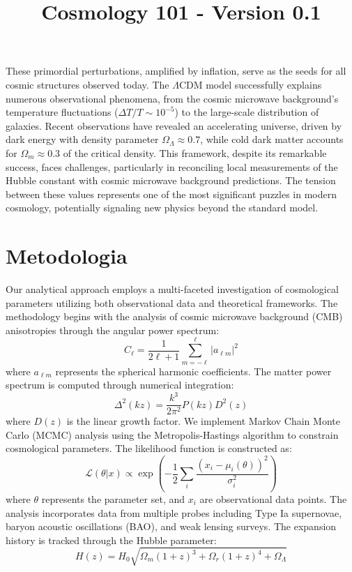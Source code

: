 \documentclass{article}\usepackage{graphicx} \usepackage{amsmath} \usepackage{colortbl}\title{Cosmology 101 - Version 0.1}
\begin{document}
These primordial perturbations, amplified by inflation, serve as the seeds for all cosmic structures observed today. The $\Lambda$CDM model successfully explains numerous observational phenomena, from the cosmic microwave background's temperature fluctuations ($\Delta T/T \sim 10^{-5}$) to the large-scale distribution of galaxies. Recent observations have revealed an accelerating universe, driven by dark energy with density parameter $\Omega_\Lambda \approx 0.7$, while cold dark matter accounts for $\Omega_m \approx 0.3$ of the critical density. This framework, despite its remarkable success, faces challenges, particularly in reconciling local measurements of the Hubble constant with cosmic microwave background predictions. The tension between these values represents one of the most significant puzzles in modern cosmology, potentially signaling new physics beyond the standard model.\section{Metodologia}
Our analytical approach employs a multi-faceted investigation of cosmological parameters utilizing both observational data and theoretical frameworks. The methodology begins with the analysis of cosmic microwave background (CMB) anisotropies through the angular power spectrum:  
\begin{equation} C_\ell = \frac{1}{2\ell + 1}\sum_{m=-\ell}^{\ell} |a_{\ell m}|^2 
\end{equation}  
where $a_{\ell m}$ represents the spherical harmonic coefficients. The matter power spectrum is computed through numerical integration:  \begin{equation} \Delta^2(k z) = \frac{k^3}{2\pi^2}P(k z)D^2(z) 
\end{equation}  
where $D(z)$ is the linear growth factor. We implement Markov Chain Monte Carlo (MCMC) analysis using the Metropolis-Hastings algorithm to constrain cosmological parameters. The likelihood function is constructed as:  
\begin{equation} 
\mathcal{L}(\theta|x) \propto \exp\left(-\frac{1}{2}\sum_i \frac{(x_i - \mu_i(\theta))^2}{\sigma_i^2}\right) 
\end{equation}  
where $\theta$ represents the parameter set, and $x_i$ are observational data points. The analysis incorporates data from multiple probes including Type Ia supernovae, baryon acoustic oscillations (BAO), and weak lensing surveys. The expansion history is tracked through the Hubble parameter:  
\begin{equation} H(z) = H_0\sqrt{\Omega_m(1+z)^3 + \Omega_r(1+z)^4 + \Omega_\Lambda} 
\end{equation}  
\end{document}
